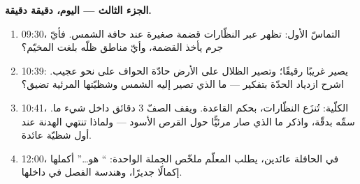 \begin{problem}
\medskip\noindent\textbf{الجزء الثالث --- اليوم، دقيقة
دقيقة.}
\begin{enumerate}[resume]
  \item 09:30، التماسّ الأول: تظهر عبر النظّارات قضمة صغيرة
        عند حافة الشمس. فأيّ جرم يأخذ القضمة، وأيّ مناطق ظلّه
        بلغت المخيّم؟
  \item 10:39: يصير  غريبًا رقيقًا؛ وتصير الظلال على
        الأرض حادّة الحواف على نحو عجيب. اشرح ازدياد الحدّة
        بتفكير   --- ما الذي تصير إليه
        الشمس وشظيّتها المرئية تضيق؟
  \item 10:41، الكلّية: تُنزَع النظّارات، بحكم القاعدة. ويقف
        الصفّ $3$ دقائق داخل شيء ما. سمِّه بدقّة، واذكر ما
        الذي صار مرئيًّا حول القرص الأسود --- ولماذا تنتهي
        الهدنة عند أول شظيّة عائدة.
  \item 12:00، في الحافلة عائدين، يطلب المعلّم ملخّص الجملة
        الواحدة: `` هو\dots'' أكملها إكمالًا جديرًا،
        وهندسة الفصل في داخلها.
\end{enumerate}
\end{problem}
